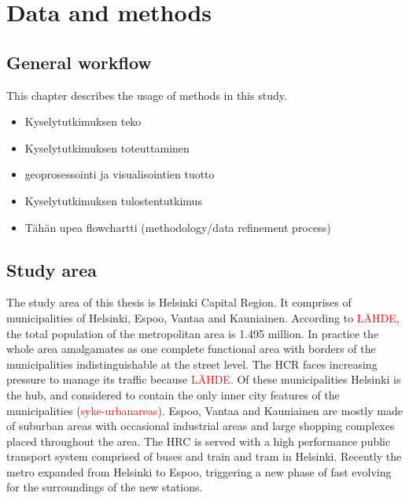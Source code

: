 \section{Data and methods}
\subsection{General workflow}
\justify
This chapter describes the usage of methods in this study.

\begin{itemize}
    \item Kyselytutkimuksen teko
    \item Kyselytutkimuksen toteuttaminen
    \item geoprosessointi ja visualisointien tuotto
    \item Kyselytutkimuksen tulostentutkimus
    \item Tähän upea flowchartti (methodology/data refinement process)
\end{itemize}

\subsection{Study area}
\justify
The study area of this thesis is Helsinki Capital Region. It comprises of municipalities of Helsinki, Espoo, Vantaa and Kauniainen. According to \textcolor{red}{LÄHDE}, the total population of the metropolitan area is 1.495 million. In practice the whole area amalgamates as one complete functional area with borders of the municipalities indistinguishable at the street level. The HCR faces increasing pressure to manage its traffic because \textcolor{red}{LÄHDE}. Of these municipalities Helsinki is the hub, and considered to contain the only inner city features of the municipalities (\textcolor{red}{syke-urbanareas}). Espoo, Vantaa and Kauniainen are mostly made of suburban areas with occasional industrial areas and large shopping complexes placed throughout the area. The HRC is served with a high performance public transport system comprised of buses and train and tram in Helsinki. Recently the metro expanded from Helsinki to Espoo, triggering a new phase of fast evolving for the surroundings of the new stations.

